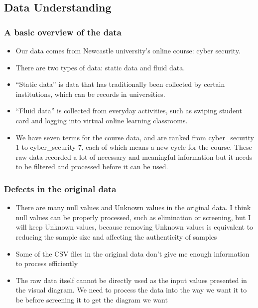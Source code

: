\documentclass[]{article}
\providecommand{\tightlist}{%
  \setlength{\itemsep}{0pt}\setlength{\parskip}{0pt}}
\begin{document}
\hypertarget{data-understanding}{%
\subsection{Data Understanding}\label{data-understanding}}

\hypertarget{a-basic-overview-of-the-data}{%
\subsubsection{A basic overview of the
data}\label{a-basic-overview-of-the-data}}

\begin{itemize}
\tightlist
\item
  Our data comes from Newcastle university's online course: cyber
  security.
\item
  There are two types of data: static data and fluid data.
\item
  ``Static data'' is data that has traditionally been collected by
  certain institutions, which can be records in universities.
\item
  ``Fluid data'' is collected from everyday activities, such as swiping
  student card and logging into virtual online learning classrooms.
\item
  We have seven terms for the course data, and are ranked from
  cyber\_security 1 to cyber\_security 7, each of which means a new
  cycle for the course. These raw data recorded a lot of necessary and
  meaningful information but it needs to be filtered and processed
  before it can be used.
\end{itemize}

\hypertarget{defects-in-the-original-data}{%
\subsubsection{Defects in the original
data}\label{defects-in-the-original-data}}

\begin{itemize}
\item
  There are many null values and Unknown values in the original data. I
  think null values can be properly processed, such as elimination or
  screening, but I will keep Unknown values, because removing Unknown
  values is equivalent to reducing the sample size and affecting the
  authenticity of samples
\item
  Some of the CSV files in the original data don't give me enough
  information to process efficiently
\item
  The raw data itself cannot be directly used as the input values
  presented in the visual diagram. We need to process the data into the
  way we want it to be before screening it to get the diagram we want
\end{itemize}
\end{document}
